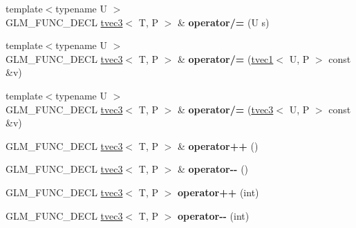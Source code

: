 \begin{DoxyCompactItemize}
\item 
\hypertarget{structglm_1_1tvec3_a89051232b40884c6723a3479d4e08a7e}{{\footnotesize template$<$typename U $>$ }\\G\-L\-M\-\_\-\-F\-U\-N\-C\-\_\-\-D\-E\-C\-L \hyperlink{structglm_1_1tvec3}{tvec3}$<$ T, P $>$ \& {\bfseries operator/=} (U s)}\label{structglm_1_1tvec3_a89051232b40884c6723a3479d4e08a7e}

\item 
\hypertarget{structglm_1_1tvec3_a05b1642c5a3b3be5a2bac556a06f3118}{{\footnotesize template$<$typename U $>$ }\\G\-L\-M\-\_\-\-F\-U\-N\-C\-\_\-\-D\-E\-C\-L \hyperlink{structglm_1_1tvec3}{tvec3}$<$ T, P $>$ \& {\bfseries operator/=} (\hyperlink{structglm_1_1tvec1}{tvec1}$<$ U, P $>$ const \&v)}\label{structglm_1_1tvec3_a05b1642c5a3b3be5a2bac556a06f3118}

\item 
\hypertarget{structglm_1_1tvec3_a0e3c90e6a8dbab2102b88775942261d1}{{\footnotesize template$<$typename U $>$ }\\G\-L\-M\-\_\-\-F\-U\-N\-C\-\_\-\-D\-E\-C\-L \hyperlink{structglm_1_1tvec3}{tvec3}$<$ T, P $>$ \& {\bfseries operator/=} (\hyperlink{structglm_1_1tvec3}{tvec3}$<$ U, P $>$ const \&v)}\label{structglm_1_1tvec3_a0e3c90e6a8dbab2102b88775942261d1}

\item 
\hypertarget{structglm_1_1tvec3_af52c5634e4366f73b2a6fbc3a12e4307}{G\-L\-M\-\_\-\-F\-U\-N\-C\-\_\-\-D\-E\-C\-L \hyperlink{structglm_1_1tvec3}{tvec3}$<$ T, P $>$ \& {\bfseries operator++} ()}\label{structglm_1_1tvec3_af52c5634e4366f73b2a6fbc3a12e4307}

\item 
\hypertarget{structglm_1_1tvec3_a3826812af4831735ecf42d05dd301cf6}{G\-L\-M\-\_\-\-F\-U\-N\-C\-\_\-\-D\-E\-C\-L \hyperlink{structglm_1_1tvec3}{tvec3}$<$ T, P $>$ \& {\bfseries operator-\/-\/} ()}\label{structglm_1_1tvec3_a3826812af4831735ecf42d05dd301cf6}

\item 
\hypertarget{structglm_1_1tvec3_abab9e3d3e770f8b195f45565d8aae566}{G\-L\-M\-\_\-\-F\-U\-N\-C\-\_\-\-D\-E\-C\-L \hyperlink{structglm_1_1tvec3}{tvec3}$<$ T, P $>$ {\bfseries operator++} (int)}\label{structglm_1_1tvec3_abab9e3d3e770f8b195f45565d8aae566}

\item 
\hypertarget{structglm_1_1tvec3_ab97387e0a5a123eb3586a05c22ffb2cc}{G\-L\-M\-\_\-\-F\-U\-N\-C\-\_\-\-D\-E\-C\-L \hyperlink{structglm_1_1tvec3}{tvec3}$<$ T, P $>$ {\bfseries operator-\/-\/} (int)}\label{structglm_1_1tvec3_ab97387e0a5a123eb3586a05c22ffb2cc}


\end{DoxyCompactItemize}
